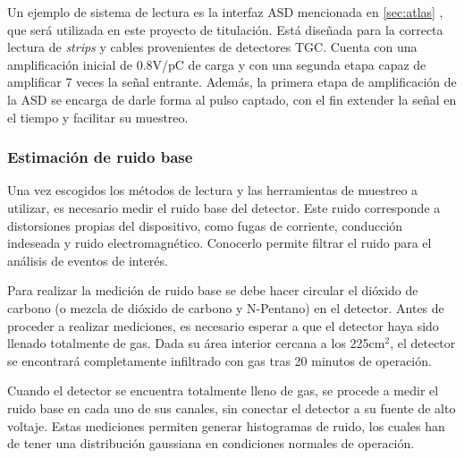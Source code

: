 		Un ejemplo de sistema de lectura es la interfaz ASD mencionada en \ref{sec:atlas} , que será utilizada en este proyecto de titulación. Está diseñada para la correcta lectura de \textit{strips} y cables provenientes de detectores TGC.  Cuenta con una amplificación inicial de 0.8V/pC de carga y con una segunda etapa capaz de amplificar 7 veces la señal entrante. Además, la primera etapa de amplificación de la ASD se encarga de darle forma al pulso captado, con el fin extender la señal en el tiempo y facilitar su muestreo.
		
		

	\subsubsection{Estimación de ruido base}
		Una vez escogidos los métodos de lectura y las herramientas de muestreo a utilizar, es necesario medir el ruido base del detector. Este ruido corresponde a distorsiones propias del dispositivo, como fugas de corriente, conducción indeseada y ruido electromagnético. Conocerlo  permite filtrar el ruido para el análisis de eventos de interés.
		
		Para realizar la medición de ruido base se debe hacer circular el dióxido de carbono (o mezcla de dióxido de carbono y N-Pentano) en el detector. Antes de proceder a realizar mediciones, es necesario esperar a que el detector haya sido llenado totalmente de gas. Dada su área interior cercana a los 225cm$^2$, el detector se encontrará completamente infiltrado con gas tras 20 minutos de operación. 
		
		Cuando el detector se encuentra totalmente lleno de gas, se procede a medir el ruido base en cada uno de sus canales, sin conectar el detector a su fuente de alto voltaje. Estas mediciones permiten generar histogramas de ruido, los cuales han de tener una distribución gaussiana en condiciones normales de operación. 
		
